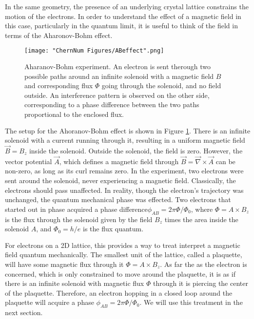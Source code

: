 In the same geometry, the presence of an underlying crystal lattice constrains the motion of the electrons. In order to understand the effect of a magnetic field in this case, particularly in the quantum limit, it is useful to think of the field in terms of the Aharonov-Bohm effect.
\begin{figure}
	\texttt{[image: "ChernNum Figures/ABeffect".png]}
\label{fig:ABphase}
\caption[Aharanov-Bohm experiment]{Aharanov-Bohm experiment. An electron is sent therough two possible paths around an infinite solenoid with a magnetic field $B$ and corresponding flux $\Phi$ going through the solenoid, and no field outside. An interference pattern is observed on the other side, corresponding to a phase difference between the two paths proportional to the enclosed flux. }
\end{figure}
The setup for the Ahoranov-Bohm effect is shown in Figure \ref{fig:ABphase}. There is an infinite solenoid with a current running through it, resulting in a uniform magnetic field $\vec{B}=B_z$\ez{} inside the solenoid. Outside the solenoid, the field is zero. However, the vector potential $\vec{A}$, which defines a magnetic field through $\vec{B} = \vec{\nabla}\times\vec{A}$ can be non-zero, as long as its curl remains zero.  In the experiment\cite{Aharonov1959}, two electrons were sent around the solenoid, never experiencing a magnetic field. Classically, the electrons should pass unaffected. In reality, though the electron's trajectory was unchanged, the quantum mechanical phase was effected. Two electrons that started out in phase acquired a phase difference$\phi_{AB} =2\pi \Phi/\Phi_0$, where $\Phi = A\times B_z$ is the flux through the solenoid given by the field $B_z$ times the area inside the solenoid $A$, and $\Phi_0 = h/e$ is the flux quantum. 

For electrons on a 2D lattice, this provides a way to treat interpret a magnetic field quantum mechanically. The smallest unit of the lattice, called a plaquette, will have some magnetic flux through it $\Phi = A\times B_z$. As far the as the electron is concerned, which is only constrained to move around the plaquette, it is as if there is an infinite solenoid with magnetic flux $\Phi$ through it is piercing the center of the plaquette. Therefore, an electron hopping in a closed loop around the plaquette will acquire a phase $\phi_{AB} =2\pi \Phi/\Phi_0$. We will use this treatment in the next section.


